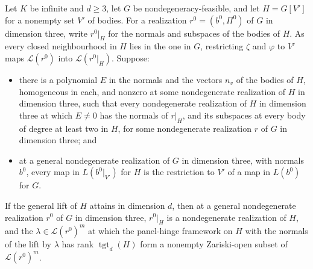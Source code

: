 \begin{lemma}
  \label{lem:pencil-d-lift-transfer}
  \leanok
  Let $K$ be infinite and $d \ge 3$, let $G$ be nondegeneracy-feasible,
  and let $H = G[V']$ for a nonempty set $V'$ of bodies. For a
  realization $r^0 = (b^0, \Pi^0)$ of $G$ in dimension three, write
  $r^0|_H$ for the normals and subspaces of the bodies of $H$. As every closed neighbourhood in $H$ lies in the one in $G$,
  restricting $\zeta$ and $\varphi$ to $V'$ maps
  $\mathcal{L}(r^0)$ into $\mathcal{L}(r^0|_H)$. Suppose:
  \begin{itemize}
    \item[(T1)] there is a polynomial $E$ in the normals and the vectors
      $n_v$ of the bodies of $H$, homogeneous in each, and nonzero at some
      nondegenerate realization of $H$ in dimension three, such that every
      nondegenerate realization of $H$ in dimension three at which
      $E \ne 0$ has the normals of $r|_H$, and its subspaces at every body
      of degree at least two in $H$, for some nondegenerate realization
      $r$ of $G$ in dimension three; and
    \item[(T2)] at a general nondegenerate realization of $G$ in dimension
      three, with normals $b^0$, every map in $L(b^0|_{V'})$ for $H$ is
      the restriction to $V'$ of a map in $L(b^0)$ for $G$.
  \end{itemize}
  If the general lift of $H$ attains in dimension $d$, then at a general
  nondegenerate realization $r^0$ of $G$ in dimension three, $r^0|_H$ is a
  nondegenerate realization of $H$, and the $\lambda \in
  \mathcal{L}(r^0)^m$ at which the panel-hinge framework on $H$ with the
  normals of the lift by $\lambda$ has rank $\operatorname{tgt}_d(H)$
  form a nonempty Zariski-open subset of $\mathcal{L}(r^0)^m$.
\end{lemma}
